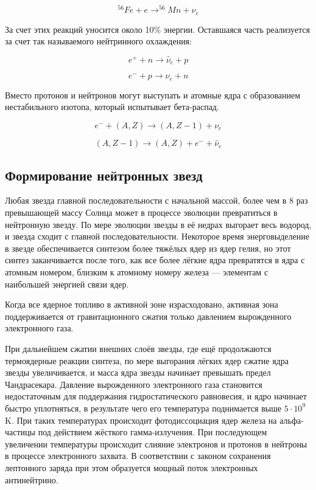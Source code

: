 \begin{equation*}
    ^ {56}Fe + e \rightarrow ^{56}Mn + \nu_e
\end{equation*}

За счет этих реакций уносится около 10\% энергии. Оставшаяся часть реализуется за счет так называемого нейтринного охлаждения:

\begin{equation*}
    e^+ +  n \rightarrow \widetilde{\nu_e} + p
\end{equation*}

\begin{equation*}
    e^- + p \rightarrow \nu_e + n
\end{equation*}

Вместо протонов и нейтронов могут выступать и атомные ядра с образованием нестабильного изотопа, который испытывает бета-распад.

\begin{equation*}
    e^- +  (A,Z) \rightarrow (A,Z-1) + \nu_e 
\end{equation*}

\begin{equation*}
    (A,Z-1) \rightarrow (A,Z) + e^- + \widetilde{\nu_e}
\end{equation*}



\subsection{Формирование нейтронных звезд}

Любая звезда главной последовательности с начальной массой, более чем в 8 раз превышающей массу Солнца может в процессе эволюции превратиться в нейтронную звезду. По мере эволюции звезды в её недрах выгорает весь водород, и звезда сходит с главной последовательности. Некоторое время энерговыделение в звезде обеспечивается синтезом более тяжёлых ядер из ядер гелия, но этот синтез заканчивается после того, как все более лёгкие ядра превратятся в ядра с атомным номером, близким к атомному номеру железа — элементам с наибольшей энергией связи ядер.

Когда все ядерное топливо в активной зоне израсходовано, активная зона поддерживается от гравитационного сжатия только давлением вырожденного электронного газа.

При дальнейшем сжатии внешних слоёв звезды, где ещё продолжаются термоядерные реакции синтеза, по мере выгорания лёгких ядер сжатие ядра звезды увеличивается, и масса ядра звезды начинает превышать предел Чандрасекара. Давление вырожденного электронного газа становится недостаточным для поддержания гидростатического равновесия, и ядро начинает быстро уплотняться, в результате чего его температура поднимается выше $5\cdot10^9$ K. При таких температурах происходит фотодиссоциация ядер железа на альфа-частицы под действием жёсткого гамма-излучения. При последующем увеличении температуры происходит слияние электронов и протонов в нейтроны в процессе электронного захвата. В соответствии с законом сохранения лептонного заряда при этом образуется мощный поток электронных антинейтрино.

